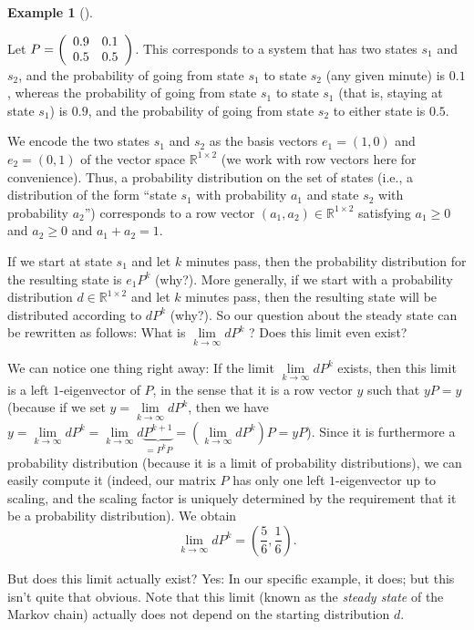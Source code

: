 \documentclass[numbers=enddot,12pt,final,onecolumn,notitlepage]{scrartcl}%
\numberwithin{exer}{subsection}
\theoremstyle{definition}
\newtheorem{exam}[theo]{Example}
\newenvironment{example}[1][]
{\begin{exam}[#1]\begin{leftbar}}
{\end{leftbar}\end{exam}}
\begin{document}
\begin{example}
\label{exa.posmat.markov-chain.1}Let $P=\left(
\begin{array}
[c]{cc}%
0.9 & 0.1\\
0.5 & 0.5
\end{array}
\right)  $. This corresponds to a system that has two states $s_{1}$ and
$s_{2}$, and the probability of going from state $s_{1}$ to state $s_{2}$ (any
given minute) is $0.1$, whereas the probability of going from state $s_{1}$ to
state $s_{1}$ (that is, staying at state $s_{1}$) is $0.9$, and the
probability of going from state $s_{2}$ to either state is $0.5$.

We encode the two states $s_{1}$ and $s_{2}$ as the basis vectors
$e_{1}=\left(  1,0\right)  $ and $e_{2}=\left(  0,1\right)  $ of the vector
space $\mathbb{R}^{1\times2}$ (we work with row vectors here for convenience).
Thus, a probability distribution on the set of states (i.e., a distribution of
the form \textquotedblleft state $s_{1}$ with probability $a_{1}$ and state
$s_{2}$ with probability $a_{2}$\textquotedblright) corresponds to a row
vector $\left(  a_{1},a_{2}\right)  \in\mathbb{R}^{1\times2}$ satisfying
$a_{1}\geq0$ and $a_{2}\geq0$ and $a_{1}+a_{2}=1$.

If we start at state $s_{1}$ and let $k$ minutes pass, then the probability
distribution for the resulting state is $e_{1}P^{k}$ (why?). More generally,
if we start with a probability distribution $d\in\mathbb{R}^{1\times2}$ and
let $k$ minutes pass, then the resulting state will be distributed according
to $dP^{k}$ (why?). So our question about the steady state can be rewritten as
follows: What is $\lim\limits_{k\rightarrow\infty}dP^{k}$ ? Does this limit
even exist?

We can notice one thing right away: If the limit $\lim\limits_{k\rightarrow
\infty}dP^{k}$ exists, then this limit is a left $1$-eigenvector of $P$, in
the sense that it is a row vector $y$ such that $yP=y$ (because if we set
$y=\lim\limits_{k\rightarrow\infty}dP^{k}$, then we have $y=\lim
\limits_{k\rightarrow\infty}dP^{k}=\lim\limits_{k\rightarrow\infty
}d\underbrace{P^{k+1}}_{=P^{k}P}=\left(  \lim\limits_{k\rightarrow\infty
}dP^{k}\right)  P=yP$). Since it is furthermore a probability distribution
(because it is a limit of probability distributions), we can easily compute it
(indeed, our matrix $P$ has only one left $1$-eigenvector up to scaling, and
the scaling factor is uniquely determined by the requirement that it be a
probability distribution). We obtain%
\[
\lim\limits_{k\rightarrow\infty}dP^{k}=\left(  \dfrac{5}{6},\dfrac{1}%
{6}\right)  .
\]


But does this limit actually exist? Yes: In our specific example, it does; but
this isn't quite that obvious. Note that this limit (known as the \emph{steady
state} of the Markov chain) actually does not depend on the starting
distribution $d$.
\end{example}
\end{document}
